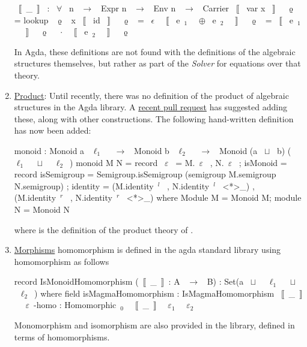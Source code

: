 \begin{enumerate}
\begin{agdacode}
~$\llbracket$~_~$\rrbracket$~ : ~$\forall$~ {n} ~$\to$~ Expr n ~$\to$~ Env n ~$\to$~ Carrier 
~$\llbracket$~ var x ~$\rrbracket$~ ~$\upvarrho$~ = lookup ~$\upvarrho$~ x 
~$\llbracket$~ id ~$\rrbracket$~ ~$\upvarrho$~ = ~$\epsilon$~ 
~$\llbracket$~ e~$_1$~ ~$\oplus$~ e~$_2$~ ~$\rrbracket$~ ~$\upvarrho$~ = ~$\llbracket$~ e~$_1$~ ~$\rrbracket$~ ~$\upvarrho$~ ~$\cdot$~ ~$\llbracket$~ e~$_2$~ ~$\rrbracket$~ ~$\upvarrho$~ 
\end{agdacode}

In Agda, these definitions are not found with the definitions of the
algebraic structures themselves, but rather as part of the
\emph{Solver} for equations over that theory.

\item \href{https://github.com/agda/agda-stdlib/blob/5365791e21af9abb324aa3721571bdceee919932/src/Algebra/Construct/DirectProduct.agda}{Product}:
Until recently, there was no definition of the product of algebraic
structures in the Agda library.  A 
\href{https://github.com/agda/agda-stdlib/pull/1109}{recent pull request}
has suggested adding these, along with other constructions.  The
following hand-written definition has now been added:
\begin{agdacode}
monoid : Monoid a ~$\ell_1$~ ~$\to$~ Monoid b ~$\ell_2$~ ~$\to$~ Monoid (a ~$\sqcup$~ b) (~$\ell_1$~ ~$\sqcup$~ ~$\ell_2$~)
monoid M N = record
  { ~$\varepsilon$~ = M.~$\varepsilon$~ , N.~$\varepsilon$~
  ; isMonoid = record 
     { isSemigroup = Semigroup.isSemigroup 
                     (semigroup M.semigroup N.semigroup)
     ; identity = (M.identity~$^{l}$~ , N.identity~$^{l}$~ <*>_)
                  , (M.identity~$^{r}$~ , N.identity~$^{r}$~ <*>_)
     }
  } where Module M = Monoid M; module N = Monoid N 
\end{agdacode}
where  is the definition of the product theory of . 

\item \href{https://github.com/agda/agda-stdlib/blob/e34a31f80b215812ab26c10f84c9a658eeda3110/src/Algebra/Morphism/Structures.agda}{Morphisms}
 homomorphism is defined in the agda standard library using  homomorphism as follows 
\begin{togcode} 
record IsMonoidHomomorphism (~$\llbracket$~_~$\rrbracket$~: A ~$\to$~ B) : Set(a ~$\sqcup$~ ~$\ell_1$~ ~$\sqcup$~ ~$\ell_2$~) where 
 field
   isMagmaHomomorphism : IsMagmaHomomorphism ~$\llbracket$~_~$\rrbracket$~
   ~$\varepsilon$~-homo   : Homomorphic~$_0$~ ~$\llbracket$~_~$\rrbracket$~ ~$\varepsilon_1$~ ~$\varepsilon_2$~
\end{togcode} 

Monomorphism and isomorphism are also provided in the library, defined in terms of homomorphisms. 
\end{enumerate}
